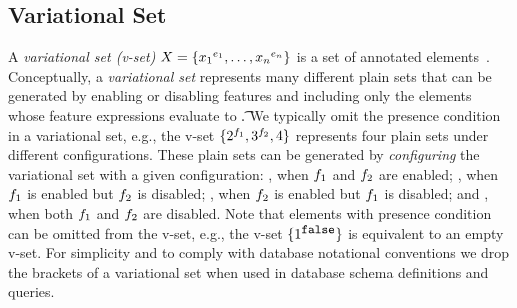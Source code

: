 \subsection{Variational Set}
\label{sec:vlist-vset}

A \emph{variational set (v-set)} $\vset = \setDef {\annot [\dimMeta_1] {\elem_1},\ldots, \annot [\dimMeta_n] {\elem_n}}$ 
is a set of annotated elements~\cite{EWC13fosd,Walk14onward,vdb17ATW}.
%
Conceptually, a \emph{variational set} represents many different plain sets
that can be generated by enabling or disabling features
and including only the elements whose feature expressions evaluate to \t.
We typically omit the presence condition  in a variational set,
e.g., the v-set 
$\setDef {\annot [\A] 2, \annot [\B] 3, 4}$
represents four plain sets under different configurations. These plain
sets can be generated by \emph{configuring} the variational set with a
given configuration: 
, when $\A$ and $\B$
are enabled; , when $\A$ is enabled but $\B$ is disabled;
, when $\B$ is enabled but $\A$ is disabled;
and , when both $\A$ and $\B$ are disabled.
%
Note that elements with presence condition  can be omitted
from the v-set, e.g., the v-set \ensuremath{\setDef {\annot [\f] {1}}} is 
equivalent to an empty v-set.
For simplicity and to comply with database notational conventions
we drop the brackets of a variational set when used in database
schema definitions and queries.

